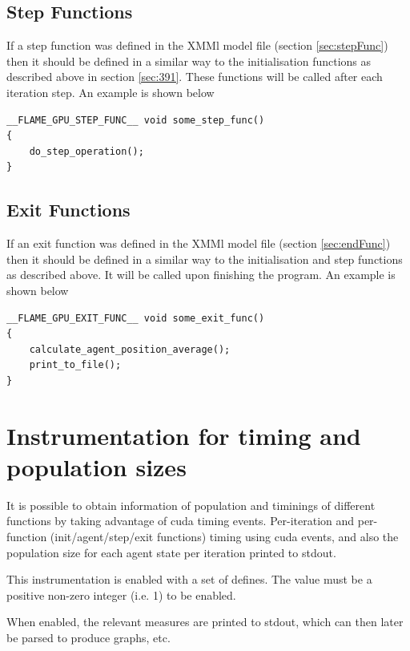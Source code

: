 \documentclass[11pt, a4paper, onecolumn, oneside]{report}
\begin{document}
\subsection{Step Functions}
\label{sec:stepFuncScript}

If a step function was defined in the XMMl model file (section \ref{sec:stepFunc}) then it should be defined in a similar way to the initialisation functions as described above in section \ref{sec:391}. These functions will be called after each iteration step. An example is shown below

\begin{verbatim}
__FLAME_GPU_STEP_FUNC__ void some_step_func()
{
    do_step_operation();
}
\end{verbatim}


\subsection{Exit Functions}
\label{sec:exitFuncScript}

If an exit function was defined in the XMMl model file (section \ref{sec:endFunc}) then it should be defined in a similar way to the initialisation and step functions as described above. It will be called upon finishing the program. An example is shown below

\begin{verbatim}
__FLAME_GPU_EXIT_FUNC__ void some_exit_func()
{
    calculate_agent_position_average();
    print_to_file();
}
\end{verbatim}

\section{Instrumentation for timing and population sizes}
\label{sec:TimingAndPop}

It is possible to obtain information of population and timinings of different functions by taking advantage of cuda timing events. Per-iteration and per-function (init/agent/step/exit functions) timing using cuda events, and also the population size for each agent state per iteration printed to stdout.

This instrumentation is enabled with a set of defines. The value must be a positive non-zero integer (i.e. 1) to be enabled.

When enabled, the relevant measures are printed to stdout, which can then later be parsed to produce graphs, etc.
\end{document}
